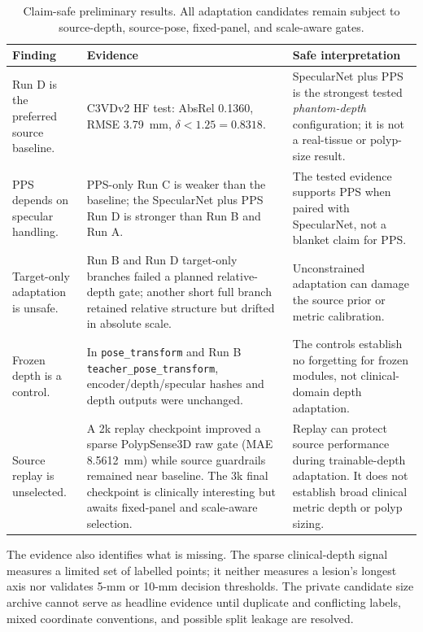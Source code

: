 \documentclass[11pt]{article}
\begin{document}
\begin{table}[t]
\centering
\footnotesize
\setlength{\tabcolsep}{4pt}
\begin{tabularx}{\textwidth}{@{}p{}p{}X@{}}
\toprule
\textbf{Finding} & \textbf{Evidence} & \textbf{Safe interpretation} \\
\midrule
Run D is the preferred source baseline. & C3VDv2 HF test: AbsRel 0.1360, RMSE 3.79~mm, $\delta<1.25=0.8318$. & SpecularNet plus PPS is the strongest tested \emph{phantom-depth} configuration; it is not a real-tissue or polyp-size result. \\

PPS depends on specular handling. & PPS-only Run C is weaker than the baseline; the SpecularNet plus PPS Run D is stronger than Run B and Run A. & The tested evidence supports PPS when paired with SpecularNet, not a blanket claim for PPS. \\

Target-only adaptation is unsafe. & Run B and Run D target-only branches failed a planned relative-depth gate; another short full branch retained relative structure but drifted in absolute scale. & Unconstrained adaptation can damage the source prior or metric calibration. \\

Frozen depth is a control. & In \texttt{pose\_transform} and Run B \texttt{teacher\_pose\_transform}, encoder/depth/specular hashes and depth outputs were unchanged. & The controls establish no forgetting for frozen modules, not clinical-domain depth adaptation. \\

Source replay is unselected. & A 2k replay checkpoint improved a sparse PolypSense3D raw gate (MAE 8.5612~mm) while source guardrails remained near baseline. The 3k final checkpoint is clinically interesting but awaits fixed-panel and scale-aware selection. & Replay can protect source performance during trainable-depth adaptation. It does not establish broad clinical metric depth or polyp sizing. \\
\bottomrule
\end{tabularx}
\caption{Claim-safe preliminary results. All adaptation candidates remain
subject to source-depth, source-pose, fixed-panel, and scale-aware gates.}
\label{tab:findings}
\end{table}

The evidence also identifies what is missing. The sparse clinical-depth signal
measures a limited set of labelled points; it neither measures a lesion's
longest axis nor validates 5-mm or 10-mm decision thresholds. The private
candidate size archive cannot serve as headline evidence until duplicate and
conflicting labels, mixed coordinate conventions, and possible split leakage
are resolved.
\end{document}
